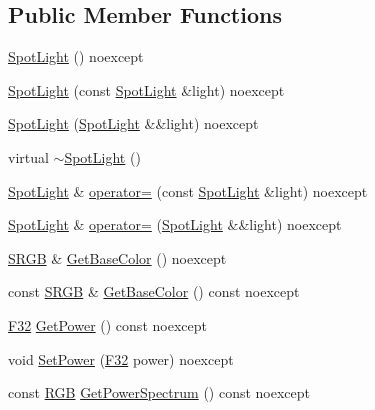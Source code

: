 \subsection*{Public Member Functions}
\begin{DoxyCompactItemize}
\item 
\hyperlink{classmage_1_1rendering_1_1_spot_light_abc287714a0bb8f4fab5960b7bcbb4316}{Spot\+Light} () noexcept
\item 
\hyperlink{classmage_1_1rendering_1_1_spot_light_a3e94a01b574efb8af5540e24d7af75c6}{Spot\+Light} (const \hyperlink{classmage_1_1rendering_1_1_spot_light}{Spot\+Light} \&light) noexcept
\item 
\hyperlink{classmage_1_1rendering_1_1_spot_light_a3520d2b04ca636436211e8e4fd929b42}{Spot\+Light} (\hyperlink{classmage_1_1rendering_1_1_spot_light}{Spot\+Light} \&\&light) noexcept
\item 
virtual \hyperlink{classmage_1_1rendering_1_1_spot_light_a3ef5b16d174fd45b40d929b8f06cdea3}{$\sim$\+Spot\+Light} ()
\item 
\hyperlink{classmage_1_1rendering_1_1_spot_light}{Spot\+Light} \& \hyperlink{classmage_1_1rendering_1_1_spot_light_a6bf91b086aa54f2e31d92ed401cf0fdc}{operator=} (const \hyperlink{classmage_1_1rendering_1_1_spot_light}{Spot\+Light} \&light) noexcept
\item 
\hyperlink{classmage_1_1rendering_1_1_spot_light}{Spot\+Light} \& \hyperlink{classmage_1_1rendering_1_1_spot_light_a58ff20b0459ccd6df54c85a361faa5ad}{operator=} (\hyperlink{classmage_1_1rendering_1_1_spot_light}{Spot\+Light} \&\&light) noexcept
\item 
\hyperlink{structmage_1_1_s_r_g_b}{S\+R\+GB} \& \hyperlink{classmage_1_1rendering_1_1_spot_light_a77ad6869c08a8dce505f2fb110c0ee26}{Get\+Base\+Color} () noexcept
\item 
const \hyperlink{structmage_1_1_s_r_g_b}{S\+R\+GB} \& \hyperlink{classmage_1_1rendering_1_1_spot_light_a1925cde1ac407d5338439bc63654e41c}{Get\+Base\+Color} () const noexcept
\item 
\hyperlink{namespacemage_aa97e833b45f06d60a0a9c4fc22ae02c0}{F32} \hyperlink{classmage_1_1rendering_1_1_spot_light_a835e4624ec959374b099dd07c7398929}{Get\+Power} () const noexcept
\item 
void \hyperlink{classmage_1_1rendering_1_1_spot_light_ac40537f953422276d68053e68df9fbe1}{Set\+Power} (\hyperlink{namespacemage_aa97e833b45f06d60a0a9c4fc22ae02c0}{F32} power) noexcept
\item 
const \hyperlink{structmage_1_1_r_g_b}{R\+GB} \hyperlink{classmage_1_1rendering_1_1_spot_light_a6dfa36c830bfa2878c04740c8c5f2e3b}{Get\+Power\+Spectrum} () const noexcept

\end{DoxyCompactItemize}
